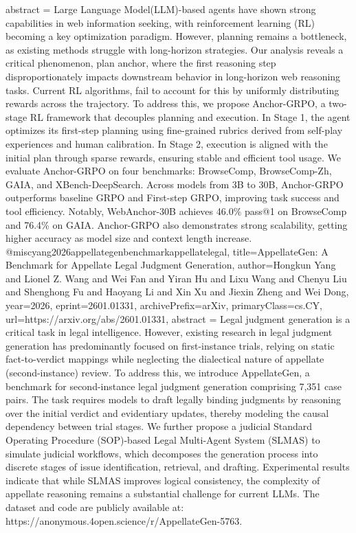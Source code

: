 {      abstract = {Large Language Model(LLM)-based agents have shown strong capabilities in web information seeking, with reinforcement learning (RL) becoming a key optimization paradigm. However, planning remains a bottleneck, as existing methods struggle with long-horizon strategies. Our analysis reveals a critical phenomenon, plan anchor, where the first reasoning step disproportionately impacts downstream behavior in long-horizon web reasoning tasks. Current RL algorithms, fail to account for this by uniformly distributing rewards across the trajectory. To address this, we propose Anchor-GRPO, a two-stage RL framework that decouples planning and execution. In Stage 1, the agent optimizes its first-step planning using fine-grained rubrics derived from self-play experiences and human calibration. In Stage 2, execution is aligned with the initial plan through sparse rewards, ensuring stable and efficient tool usage. We evaluate Anchor-GRPO on four benchmarks: BrowseComp, BrowseComp-Zh, GAIA, and XBench-DeepSearch. Across models from 3B to 30B, Anchor-GRPO outperforms baseline GRPO and First-step GRPO, improving task success and tool efficiency. Notably, WebAnchor-30B achieves 46.0\% pass@1 on BrowseComp and 76.4\% on GAIA. Anchor-GRPO also demonstrates strong scalability, getting higher accuracy as model size and context length increase.}
}@misc{yang2026appellategenbenchmarkappellatelegal,
      title={AppellateGen: A Benchmark for Appellate Legal Judgment Generation}, 
      author={Hongkun Yang and Lionel Z. Wang and Wei Fan and Yiran Hu and Lixu Wang and Chenyu Liu and Shenghong Fu and Haoyang Li and Xin Xu and Jiexin Zheng and Wei Dong},
      year={2026},
      eprint={2601.01331},
      archivePrefix={arXiv},
      primaryClass={cs.CY},
      url={https://arxiv.org/abs/2601.01331},
      abstract = {Legal judgment generation is a critical task in legal intelligence. However, existing research in legal judgment generation has predominantly focused on first-instance trials, relying on static fact-to-verdict mappings while neglecting the dialectical nature of appellate (second-instance) review. To address this, we introduce AppellateGen, a benchmark for second-instance legal judgment generation comprising 7,351 case pairs. The task requires models to draft legally binding judgments by reasoning over the initial verdict and evidentiary updates, thereby modeling the causal dependency between trial stages. We further propose a judicial Standard Operating Procedure (SOP)-based Legal Multi-Agent System (SLMAS) to simulate judicial workflows, which decomposes the generation process into discrete stages of issue identification, retrieval, and drafting. Experimental results indicate that while SLMAS improves logical consistency, the complexity of appellate reasoning remains a substantial challenge for current LLMs. The dataset and code are publicly available at: https://anonymous.4open.science/r/AppellateGen-5763.}
}
